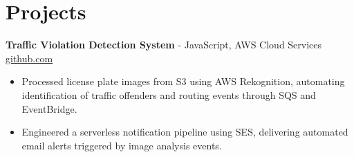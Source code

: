 \documentclass[11pt]{article}       %
\begin{document}
\vspace{-18.5pt}

\section*{Projects}

\textbf{Traffic Violation Detection System}{ - JavaScript, AWS Cloud Services} \hfill \href{https://github.com/Monica20030707/AWS_rekonigition-N-read-database}{github.com} \\
\vspace{-9pt}
\begin{itemize}
  \item Processed license plate images from S3 using AWS Rekognition, automating identification of traffic offenders and routing events through SQS and EventBridge.
  \item Engineered a serverless notification pipeline using SES, delivering automated email alerts triggered by image analysis events.
\end{itemize}

\end{document}
